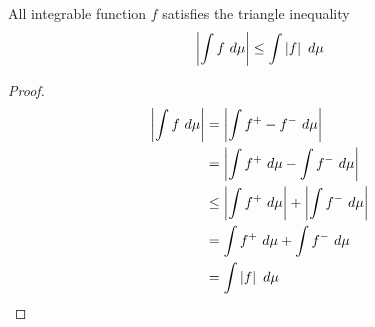 \documentclass[11pt]{article}
\begin{document}
	\begin{proposition}
		All integrable function $f$ satisfies the triangle inequality
		\begin{align}
			\left \vert {\int f\ d\mu} \right \vert \leq \int \left \vert {f} \right \vert\ d\mu
		\end{align}
		
		\begin{proof}
			\begin{align}
				\left \vert {\int f\ d\mu} \right \vert &= \left \vert {\int f^+ - f^-\ d\mu} \right \vert\\
				&= \left \vert {\int f^+\ d\mu - \int f^-\ d\mu} \right \vert\\
				&\leq \left \vert {\int f^+\ d\mu} \right \vert + \left \vert {\int f^-\ d\mu} \right \vert \\
				&= \int f^+\ d\mu + \int f^-\ d\mu \\
				&= \int \left \vert {f} \right \vert\ d\mu
			\end{align}
		\end{proof}
	\end{proposition}
	
\end{document}
